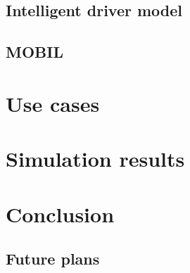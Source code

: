 \documentclass[a4paper,12pt,twoside]{book}
\begin{document}
		\section{Intelligent driver model}
		\section{MOBIL}
	\chapter{Use cases}
	\chapter{Simulation results}
	\chapter{Conclusion}
		\section{}
		\section{Future plans}
\end{document}
